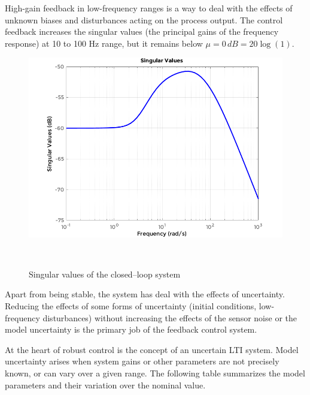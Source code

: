 High-gain feedback in low-frequency ranges is a way to deal with the effects of unknown biases and disturbances acting on the process output. The control feedback increases the singular values (the principal gains of the frequency response) at 10 to 100 Hz range, but it remains below $\mu=0\,dB=20 \log (1)$.
\begin{figure}[!h]
	\includegraphics[width=1\linewidth]{figs/06/control/singular_values_2}
	\caption{Singular values of the closed--loop system}
	\\[-5cm]
\end{figure}

\newpage
Apart from being stable, the system has deal with the effects of uncertainty. Reducing the effects of some forms of uncertainty (initial conditions, low-frequency disturbances) without increasing the effects of the sensor noise or the model uncertainty is the primary job of the feedback control system.

At the heart of robust control is the concept of an uncertain LTI system. Model uncertainty arises when system gains or other parameters are not precisely known, or can vary over a given range. The following table summarizes the model parameters and their variation over the nominal value.

